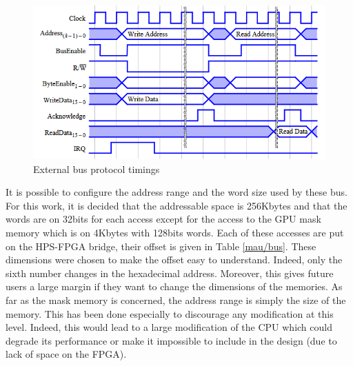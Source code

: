 \begin{figure}[H]
    \center
    \includegraphics[scale=0.8]{"Chapter4-MAU_CTRLU/res/external_bus_timings.PNG"}
    \caption{External bus protocol timings}
    \label{fig:mau/bus_bridge_protocol}
\end{figure}

It is possible to configure the address range and the word size used by these bus. For this work, 
it is decided that the 
addressable space is 256Kbytes and that the words are on 32bits for each access except for the 
access to the GPU mask memory which is on 4Kbytes with 128bits words. Each of these accesses are 
put on the HPS-FPGA bridge, their offset is given in Table \ref{mau/bus}. These dimensions were 
chosen to make the offset easy to understand. Indeed, only the sixth number changes in the 
hexadecimal address. Moreover, this gives future users a large margin if they want to change the 
dimensions of the memories. As far as the mask memory is concerned, the address range is simply the 
size of the memory. This has been done especially to discourage any modification at this level. 
Indeed, this would lead to a large modification of the CPU which could degrade its performance or 
make it impossible to include in the design (due to lack of space on the FPGA).

